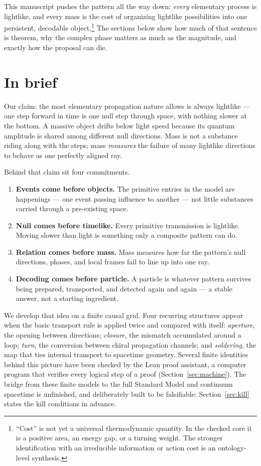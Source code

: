 \documentclass[11pt]{article}
\begin{document}
This manuscript pushes the pattern all the way down: \emph{every} elementary
process is lightlike, and every mass is the cost of organizing lightlike
possibilities into one persistent, decodable object.\footnote{``Cost'' is not
yet a universal thermodynamic quantity.  In the checked core it is a positive
area, an energy gap, or a turning weight.  The stronger identification with
an irreducible information or action cost is an ontology-level synthesis.}
The sections below show how much of that sentence is theorem, why the complex
phase matters as much as the magnitude, and exactly how the proposal can die.

\section*{In brief}

Our claim: the most elementary propagation nature allows is always lightlike
--- one step forward in time is one null step through space, with nothing
slower at the bottom.  A massive object drifts below light speed because its
quantum amplitude is shared among different null directions.  Mass is not a
substance riding along with the steps; mass \emph{measures} the failure of
many lightlike directions to behave as one perfectly aligned ray.

Behind that claim sit four commitments.

\begin{enumerate}[leftmargin=1.6em]
  \item \textbf{Events come before objects.}  The primitive entries in the
        model are happenings --- one event passing influence to another ---
        not little substances carried through a pre-existing space.
  \item \textbf{Null comes before timelike.}  Every primitive transmission is
        lightlike.  Moving slower than light is something only a composite
        pattern can do.
  \item \textbf{Relation comes before mass.}  Mass measures how far the
        pattern's null directions, phases, and local frames fail to line up
        into one ray.
  \item \textbf{Decoding comes before particle.}  A particle is whatever
        pattern survives being prepared, transported, and detected again and
        again --- a stable answer, not a starting ingredient.
\end{enumerate}

We develop that idea on a finite causal grid.  Four recurring structures appear
when the basic transport rule is applied twice and compared with itself:
\emph{aperture}, the opening
between directions; \emph{closure}, the mismatch accumulated around a loop;
\emph{turn}, the conversion between chiral propagation channels; and
\emph{soldering}, the map that ties internal transport to spacetime geometry.
Several finite identities behind this picture have been checked by the Lean
proof assistant, a computer program that verifies every logical step of a proof
(Section~\ref{sec:machine}).  The bridge from these finite models to the full
Standard Model and continuum spacetime is unfinished, and deliberately built
to be falsifiable: Section~\ref{sec:kill} states the kill conditions in
advance.
\end{document}
